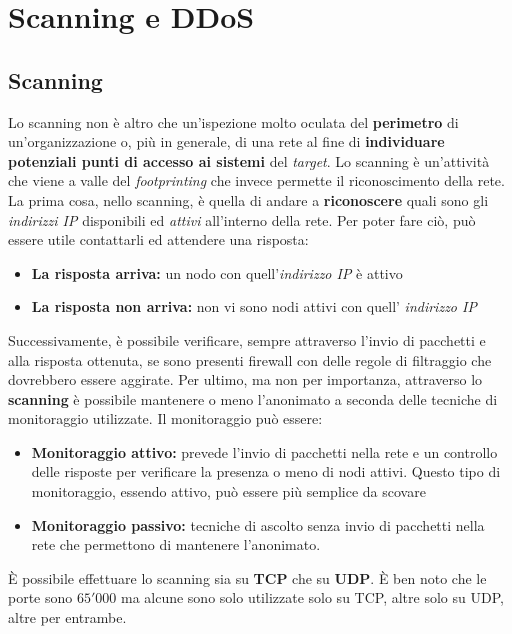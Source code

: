 \setcounter{secnumdepth}{5}

\chapter{Scanning e DDoS}


\section{Scanning}
Lo scanning non è altro che un'ispezione molto oculata del \textbf{perimetro} di un'organizzazione o, più in generale, di una rete al fine di \textbf{individuare potenziali punti di accesso ai sistemi} del \textit{target}. Lo scanning è un'attività che viene a valle del \textit{footprinting} che invece permette il riconoscimento della rete. 
\newline La prima cosa, nello scanning, è quella di andare a \textbf{riconoscere} quali sono gli \textit{indirizzi IP} disponibili ed \textit{attivi} all'interno della rete. Per poter fare ciò, può essere utile contattarli ed attendere una risposta:
\begin{itemize}
    \item \textbf{La risposta arriva:} un nodo con quell'\textit{indirizzo IP} è attivo
    \item \textbf{La risposta non arriva:} non vi sono nodi attivi con quell' \textit{indirizzo IP}
\end{itemize}

Successivamente, è possibile verificare, sempre attraverso l'invio di pacchetti e alla risposta ottenuta, se sono presenti firewall con delle regole di filtraggio che dovrebbero essere aggirate. Per ultimo, ma non per importanza, attraverso lo \textbf{scanning} è possibile mantenere o meno l'anonimato a seconda delle tecniche di monitoraggio utilizzate. \newline Il monitoraggio può essere:
\begin{itemize}
    \item \textbf{Monitoraggio attivo:} prevede l'invio di pacchetti nella rete e un controllo delle risposte per verificare la presenza o meno di nodi attivi. Questo tipo di monitoraggio, essendo attivo, può essere più semplice da scovare
    \item \textbf{Monitoraggio passivo:} tecniche di ascolto senza invio di pacchetti nella rete che permettono di mantenere l'anonimato. 
\end{itemize}

È possibile effettuare lo scanning sia su \textbf{TCP} che su \textbf{UDP}. È ben noto che le porte sono $65'000$ ma alcune sono solo utilizzate solo su TCP, altre solo su UDP, altre per entrambe. 


